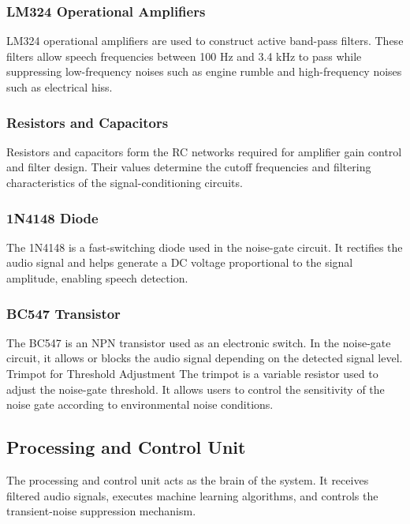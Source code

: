 \subsubsection{LM324 Operational Amplifiers}

LM324 operational amplifiers are used to construct active band-pass filters. These filters allow speech frequencies between 100 Hz and 3.4 kHz to pass while suppressing low-frequency noises such as engine rumble and high-frequency noises such as electrical hiss. 

\subsubsection{Resistors and Capacitors}

Resistors and capacitors form the RC networks required for amplifier gain control and filter design. Their values determine the cutoff frequencies and filtering characteristics of the signal-conditioning circuits.


\subsubsection{1N4148 Diode}

The 1N4148 is a fast-switching diode used in the noise-gate circuit. It rectifies the audio signal and helps generate a DC voltage proportional to the signal amplitude, enabling speech detection.

\subsubsection{BC547 Transistor}

The BC547 is an NPN transistor used as an electronic switch. In the noise-gate circuit, it allows or blocks the audio signal depending on the detected signal level.
Trimpot for Threshold Adjustment
The trimpot is a variable resistor used to adjust the noise-gate threshold. It allows users to control the sensitivity of the noise gate according to environmental noise conditions.

\subsection{Processing and Control Unit}
The processing and control unit acts as the brain of the system. It receives filtered audio signals, executes machine learning algorithms, and controls the transient-noise suppression mechanism.

